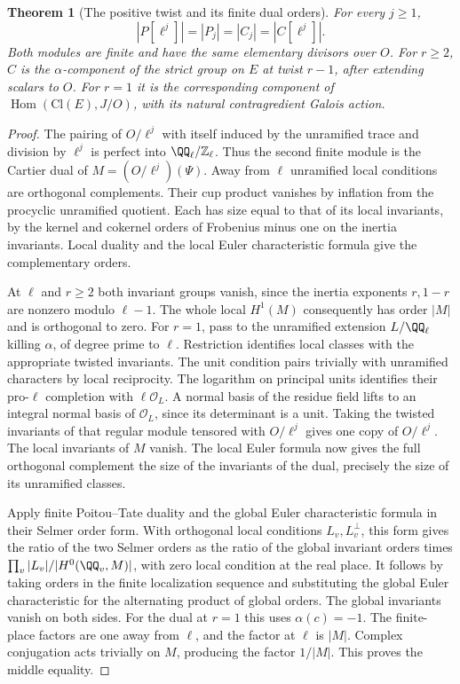\documentclass[a4paper,11pt]{article}
\newtheorem{theorem}[proposition]{Theorem}
\theoremstyle{definition}
\theoremstyle{remark}
\newcommand{\ZZ}{\mathbb Z}\newcommand{\ord}{\operatorname{ord}}
\numberwithin{equation}{section}
\begin{document}
\begin{theorem}[The positive twist and its finite dual orders]\leavevmode
\label{thm:positive306}
For every \(j\ge1\),
\[
       |P[\ell^j]|=|P_j|=|C_j|=|C[\ell^j]|.
\]
Both modules are finite and have the same elementary divisors
over \(O\). For \(r\ge2\), \(C\) is the \(\alpha\)-component
of the strict group on \(E\) at twist \(r-1\), after extending
scalars to \(O\). For \(r=1\) it is the corresponding
component of
\(\operatorname{Hom}(\mathrm{Cl}(E),J/O)\), with its natural
contragredient Galois action.
\end{theorem}
\begin{proof}
The pairing of \(O/\ell^j\) with itself induced by the
unramified trace and division by \(\ell^j\) is perfect into
\(\QQ_\ell/\ZZ_\ell\). Thus the second finite module is the
Cartier dual of \(M=(O/\ell^j)(\Psi)\). Away from \(\ell\)
unramified local conditions are orthogonal complements. Their
cup product vanishes by inflation from the procyclic unramified
quotient. Each has size equal to that of its local invariants,
by the kernel and cokernel orders of Frobenius minus one on the
inertia invariants. Local duality and the local Euler
characteristic formula give the complementary orders.

At \(\ell\) and \(r\ge2\) both invariant groups vanish, since
the inertia exponents \(r,1-r\) are nonzero modulo \(\ell-1\).
The whole local \(H^1(M)\) consequently has order \(|M|\) and
is orthogonal to zero. For \(r=1\), pass to the unramified
extension \(L/\QQ_\ell\) killing \(\alpha\), of degree prime
to \(\ell\). Restriction identifies local classes with the
appropriate twisted invariants. The unit condition pairs
trivially with unramified characters by local reciprocity.
The logarithm on principal units identifies their pro-\(\ell\)
completion with \(\ell\mathcal O_L\). A normal basis of the
residue field lifts to an integral normal basis of
\(\mathcal O_L\), since its determinant is a unit. Taking
the twisted invariants of that regular module tensored with
\(O/\ell^j\) gives one copy of \(O/\ell^j\). The local
invariants of \(M\) vanish. The local Euler formula now gives
the full orthogonal complement the size of the invariants of
the dual, precisely the size of its unramified classes.

Apply finite Poitou--Tate duality and the global Euler
characteristic formula in their Selmer order form. With
orthogonal local conditions \(L_v,L_v^\perp\), this form gives
the ratio of the two Selmer orders as the ratio of the global
invariant orders times
\(\prod_v |L_v|/|H^0(\QQ_v,M)|\), with zero local condition at
the real place. It follows by taking orders in the finite
localization sequence and substituting the global Euler
characteristic for the alternating product of global orders.
\cite[Chapter I]{V-III-II-duality13}
The global invariants vanish on both sides. For the dual at
\(r=1\) this uses \(\alpha(c)=-1\). The finite-place factors
are one away from \(\ell\), and the factor at \(\ell\) is
\(|M|\). Complex conjugation acts trivially on \(M\), producing
the factor \(1/|M|\). This proves the middle equality.


\end{proof}
\end{document}
